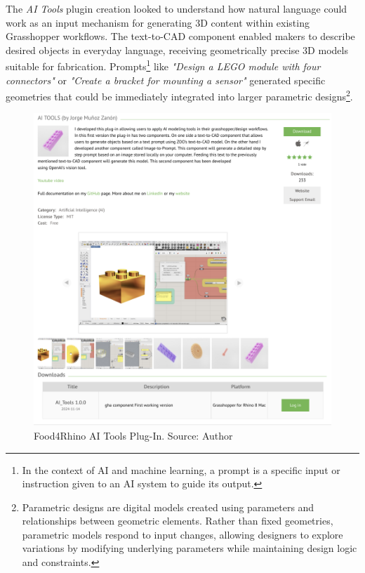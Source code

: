 The \textit{AI Tools} plugin creation looked to understand how natural language could work as an input mechanism for generating 3D content within existing Grasshopper workflows. The text-to-CAD component enabled makers to describe desired objects in everyday language, receiving geometrically precise 3D models suitable for fabrication. Prompts\footnote{In the context of AI and machine learning, a prompt is a specific input or instruction given to an AI system to guide its output.} like \textit{"Design a LEGO module with four connectors"} or \textit{"Create a bracket for mounting a sensor"} generated specific geometries that could be immediately integrated into larger parametric designs\footnote{Parametric designs are digital models created using parameters and relationships between geometric elements. Rather than fixed geometries, parametric models respond to input changes, allowing designers to explore variations by modifying underlying parameters while maintaining design logic and constraints.}.

\begin{figure}[H]
\centering
\includegraphics[width=1\textwidth]{figures/chapter3/AI_Tools.png}
\caption{Food4Rhino AI Tools Plug-In. Source: Author}
\label{fig:ai_tools}
\end{figure}

